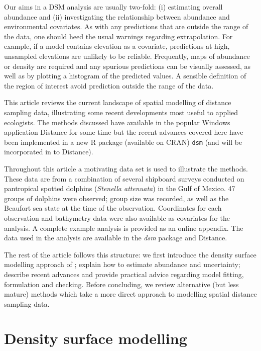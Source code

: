 \documentclass[a4paper,12pt]{article}
\begin{document}
Our aims in a DSM analysis are usually two-fold: (i) estimating overall abundance and (ii) investigating the relationship between abundance and environmental covariates. As with any predictions that are outside the range of the data, one should heed the usual warnings regarding extrapolation. For example, if a model contains elevation as a covariate, predictions at high, unsampled elevations are unlikely to be reliable. Frequently, maps of abundance or density are required and any spurious predictions can be visually assessed, as well as by plotting a histogram of the predicted values. A sensible definition of the region of interest avoid prediction outside the range of the data.

This article reviews the current landscape of spatial modelling of distance sampling data, illustrating some recent developments most useful to applied ecologists. The methods discussed have available in the popular Windows application Distance \citep{Thomas:2010cf} for some time but the recent advances covered here have been implemented in a new \textsf{R} package (available on CRAN) \texttt{dsm} (and will be incorporated in to Distance).

Throughout this article a motivating data set is used to illustrate the methods. These data are from a combination of several shipboard surveys conducted on pantropical spotted dolphins (\textit{Stenella attenuata}) in the Gulf of Mexico. 47 groups of dolphins were observed; group size was recorded, as well as the Beaufort sea state at the time of the observation. Coordinates for each observation and bathymetry data were also available as covariates for the analysis. A complete example analysis is provided as an online appendix. The data used in the analysis are available in the \textit{dsm} package and Distance.

The rest of the article follows this structure: we first introduce the density surface modelling approach of \cite{Hedley:2004et}; explain how to estimate abundance and uncertainty; describe recent advances and provide practical advice regarding model fitting, formulation and checking. Before concluding, we review alternative (but less mature) methods which take a more direct approach to modelling spatial distance sampling data.


\section*{Density surface modelling}
\label{s:dsm}
\end{document}
